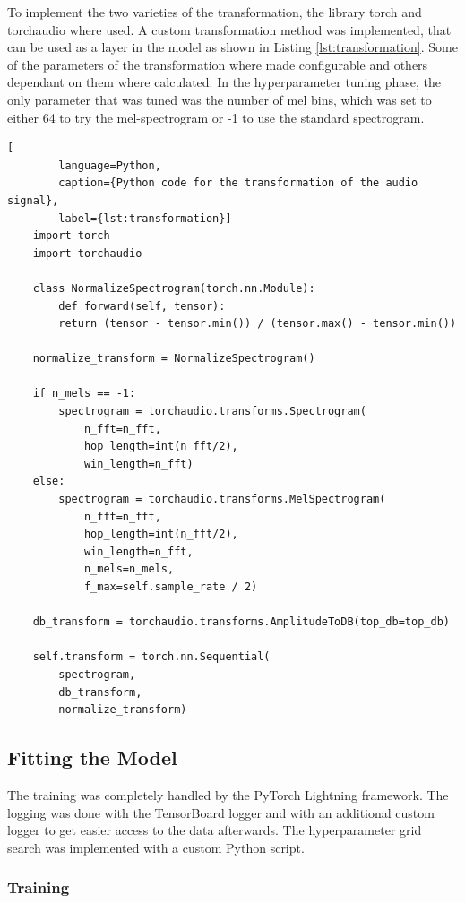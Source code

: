 To implement the two varieties of the transformation, the library torch and torchaudio where used.
A custom transformation method was implemented, that can be used as a layer in the model as shown in 
Listing \ref{lst:transformation}. Some of the parameters of the transformation where made configurable
and others dependant on them where calculated. In the hyperparameter tuning phase, the only parameter
that was tuned was the number of mel bins, which was set to either 64 to try the mel-spectrogram or -1
to use the standard spectrogram.

    \begin{lstlisting}[
        language=Python, 
        caption={Python code for the transformation of the audio signal}, 
        label={lst:transformation}]
    import torch
    import torchaudio

    class NormalizeSpectrogram(torch.nn.Module):
        def forward(self, tensor):
        return (tensor - tensor.min()) / (tensor.max() - tensor.min())

    normalize_transform = NormalizeSpectrogram()

    if n_mels == -1:
        spectrogram = torchaudio.transforms.Spectrogram(
            n_fft=n_fft, 
            hop_length=int(n_fft/2), 
            win_length=n_fft)
    else:
        spectrogram = torchaudio.transforms.MelSpectrogram(
            n_fft=n_fft,
            hop_length=int(n_fft/2),
            win_length=n_fft,
            n_mels=n_mels,
            f_max=self.sample_rate / 2)

    db_transform = torchaudio.transforms.AmplitudeToDB(top_db=top_db)

    self.transform = torch.nn.Sequential(
        spectrogram, 
        db_transform, 
        normalize_transform)
    \end{lstlisting}


\subsection{Fitting the Model}

The training was completely handled by the PyTorch Lightning framework. The logging was done
with the TensorBoard logger and with an additional custom logger to get easier access to the
data afterwards. The hyperparameter grid search was implemented with a custom Python script.

\subsubsection{Training}

